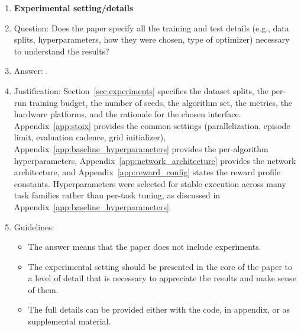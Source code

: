 \begin{enumerate}
\item {\bf Experimental setting/details}
    \item[] Question: Does the paper specify all the training and test details (e.g., data splits, hyperparameters, how they were chosen, type of optimizer) necessary to understand the results?
    \item[] Answer: \answerYes{}.
    \item[] Justification: Section~\ref{sec:experiments} specifies the dataset splits, the per-run training budget, the number of seeds, the algorithm set, the metrics, the hardware platforms, and the rationale for the chosen interface. Appendix~\ref{app:stoix} provides the common settings (parallelization, episode limit, evaluation cadence, grid initializer), Appendix~\ref{app:baseline_hyperparameters} provides the per-algorithm hyperparameters, Appendix~\ref{app:network_architecture} provides the network architecture, and Appendix~\ref{app:reward_config} states the reward profile constants. Hyperparameters were selected for stable execution across many task families rather than per-task tuning, as discussed in Appendix~\ref{app:baseline_hyperparameters}.
    \item[] Guidelines:
    \begin{itemize}
        \item The answer \answerNA{} means that the paper does not include experiments.
        \item The experimental setting should be presented in the core of the paper to a level of detail that is necessary to appreciate the results and make sense of them.
        \item The full details can be provided either with the code, in appendix, or as supplemental material.
    \end{itemize}


\end{enumerate}
